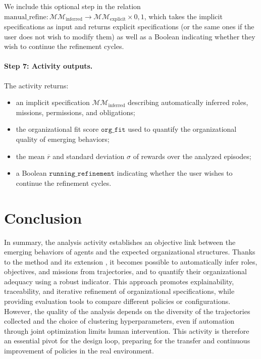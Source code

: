 We include this optional step in the relation $\text{manual\_refine}: \mathcal{MM}_{\text{inferred}} \rightarrow \mathcal{MM}_{\text{explicit}} \times {0,1}$, which takes the implicit specifications as input and returns explicit specifications (or the same ones if the user does not wish to modify them) as well as a Boolean indicating whether they wish to continue the refinement cycles.

\paragraph{Step 7: Activity outputs.}
The activity returns:
\begin{itemize}
  \item an implicit specification $\mathcal{MM}_{\text{inferred}}$ describing automatically inferred roles, missions, permissions, and obligations;
  \item the organizational fit score $\texttt{org\_fit}$ used to quantify the organizational quality of emerging behaviors;
  \item the mean $\overline{r}$ and standard deviation $\sigma$ of rewards over the analyzed episodes;
  \item a Boolean $\texttt{running\_refinement}$ indicating whether the user wishes to continue the refinement cycles.
\end{itemize}


\section {Conclusion}

In summary, the analysis activity establishes an objective link between the emerging behaviors of agents and the expected organizational structures. Thanks to the  method and its extension , it becomes possible to automatically infer roles, objectives, and missions from trajectories, and to quantify their organizational adequacy using a robust indicator. This approach promotes explainability, traceability, and iterative refinement of organizational specifications, while providing evaluation tools to compare different policies or configurations. However, the quality of the analysis depends on the diversity of the trajectories collected and the choice of clustering hyperparameters, even if automation through joint optimization limits human intervention. This activity is therefore an essential pivot for the  design loop, preparing for the transfer and continuous improvement of policies in the real environment.


